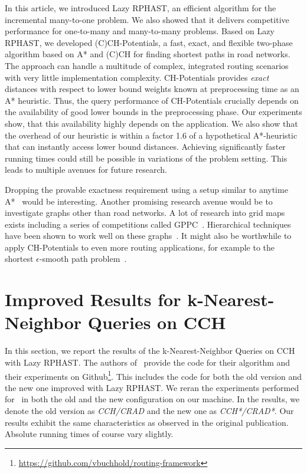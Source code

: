 \documentclass[manuscript,review]{acmart}
\begin{document}
In this article, we introduced Lazy RPHAST, an efficient algorithm for the incremental many-to-one problem.
We also showed that it delivers competitive performance for one-to-many and many-to-many problems.
Based on Lazy RPHAST, we developed (C)CH-Potentials, a fast, exact, and flexible two-phase algorithm based on A* and (C)CH for finding shortest paths in road networks.
The approach can handle a multitude of complex, integrated routing scenarios with very little implementation complexity.
CH-Potentials provides \emph{exact} distances with respect to lower bound weights known at preprocessing time as an A* heuristic.
Thus, the query performance of CH-Potentials crucially depends on the availability of good lower bounds in the preprocessing phase.
Our experiments show, that this availability highly depends on the application.
We also show that the overhead of our heuristic is within a factor 1.6 of a hypothetical A*-heuristic that can instantly access lower bound distances.
Achieving significantly faster running times could still be possible in variations of the problem setting.
This leads to multiple avenues for future research.

Dropping the provable exactness requirement using a setup similar to anytime A*~\cite{DBLP:conf/aaai/ZhouH02,DBLP:conf/nips/LikhachevGT03} would be interesting.
Another promising research avenue would be to investigate graphs other than road networks.
A lot of research into grid maps exists including a series of competitions called GPPC~\cite{DBLP:conf/socs/SturtevantTTUKS15}.
Hierarchical techniques have been shown to work well on these graphs~\cite{DBLP:conf/aaai/UrasK14}.
It might also be worthwhile to apply CH-Potentials to even more routing applications, for example to the shortest $\epsilon$-smooth path problem~\cite{dss-tarrn-18}.






\appendix

\section{Improved Results for k-Nearest-Neighbor Queries on CCH}

In this section, we report the results of the k-Nearest-Neighbor Queries on CCH with Lazy RPHAST.
The authors of~\cite{buchhold_et_al:LIPIcs.SEA.2021.18} provide the code for their algorithm and their experiments on Github\footnote{\url{https://github.com/vbuchhold/routing-framework}}.
This includes the code for both the old version and the new one improved with Lazy RPHAST.
We reran the experiments performed for~\cite{buchhold_et_al:LIPIcs.SEA.2021.18} in both the old and the new configuration on our machine.
In the results, we denote the old version as \emph{CCH/CRAD} and the new one as \emph{CCH*/CRAD*}.
Our results exhibit the same characteristics as observed in the original publication.
Absolute running times of course vary slightly.
\end{document}
